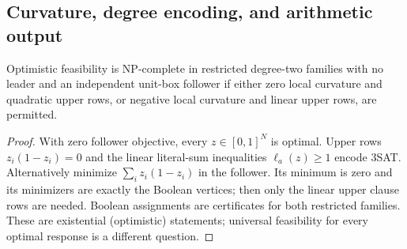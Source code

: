 \subsection{Curvature, degree encoding, and arithmetic output}
\label{subsec:arithmetic-boundaries}
\begin{proposition}\label{prop:curvature-boundary}
Optimistic feasibility is NP-complete in restricted degree-two families with
no leader and an independent unit-box follower if either zero local curvature
and quadratic upper rows, or negative local curvature and linear upper rows,
are permitted.
\end{proposition}
\begin{proof}
With zero follower objective, every \(z\in[0,1]^N\) is optimal. Upper rows
\(z_i(1-z_i)=0\) and the linear literal-sum inequalities \(\ell_a(z)\ge1\)
encode 3SAT. Alternatively minimize \(\sum_i z_i(1-z_i)\) in the follower.
Its minimum is zero and its minimizers are exactly the Boolean vertices;
then only the linear upper clause rows are needed. Boolean assignments are
certificates for both restricted families. These are existential (optimistic)
statements; universal feasibility for every optimal response is a different
question.
\end{proof}

